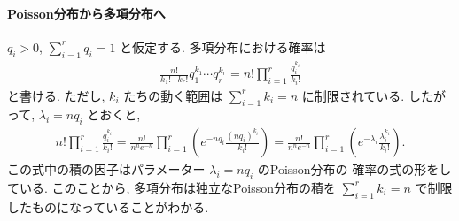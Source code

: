 \documentclass[12pt,twoside]{jarticle}
\theoremstyle{jplain}
\theoremstyle{jplain}
\theoremstyle{jplain}
\numberwithin{theorem}{section}
\numberwithin{equation}{section}
\numberwithin{figure}{section}
\numberwithin{table}{section}
\begin{document}
\paragraph{Poisson分布から多項分布へ}
$q_i>0$, $\sum_{i=1}^r q_i=1$ と仮定する.
多項分布における確率は
\begin{align*}
\frac{n!}{k_1!\cdots k_r!} q_1^{k_1}\cdots q_r^{k_r}
=n!\prod_{i=1}^r \frac{q_i^{k_i}}{k_i!}
\end{align*}
と書ける. ただし, $k_i$ たちの動く範囲は $\sum_{i=1}^r k_i=n$ に制限されている. 
したがって, $\lambda_i=nq_i$ とおくと, 
\begin{align*}
n!\prod_{i=1}^r \frac{q_i^{k_i}}{k_i!}
=\frac{n!}{n^n e^{-n}}
\prod_{i=1}^r \left( e^{-nq_i}\frac{(nq_i)^{k_i}}{k_i!} \right)
=\frac{n!}{n^n e^{-n}}
\prod_{i=1}^r \left( e^{-\lambda_i}\frac{\lambda_i^{k_i}}{k_i!} \right).
\end{align*}
この式中の積の因子はパラメーター $\lambda_i=nq_i$ のPoisson分布の
確率の式の形をしている. 
このことから, 多項分布は独立なPoisson分布の積を $\sum_{i=1}^r k_i=n$
で制限したものになっていることがわかる.
\end{document}
